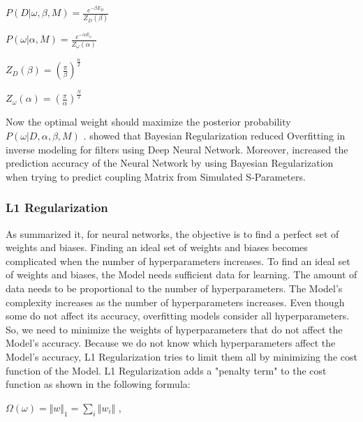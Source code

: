 \documentclass[oneside,12pt,article]{article}
\begin{document}
 \begin{center}
$ P(D|\omega,\beta,M) = \frac{e^{-\beta E_D} }{Z_D(\beta) } $
\end{center}

 \begin{center}
$ P(\omega|\alpha,M) =\frac{e^{-\alpha E_\omega}}{Z_\omega(\alpha)} $
\end{center}

 \begin{center}
$ Z_D(\beta) =(\frac{\pi}{\beta})^\frac{n}{2}$
\end{center}

 \begin{center}
$ Z_\omega(\alpha)=(\frac{\pi}{\alpha})^\frac{N}{2} $
\end{center}
Now the optimal weight should maximize the posterior probability $ P(\omega| D,\alpha, \beta,M) $ \cite{yue2011bayesian}. \cite{pan2020inverse} showed that Bayesian Regularization reduced Overfitting in inverse modeling for filters using Deep Neural Network. Moreover, \cite{pan2020inverse} increased the prediction accuracy of the Neural Network by using Bayesian Regularization when trying to predict coupling Matrix from Simulated S-Parameters.  


\subsubsection{L1 Regularization}

As \cite{ ying2019overview} summarized it, for neural networks, the objective is to find a perfect set of weights and biases. Finding an ideal set of weights and biases becomes complicated when the number of hyperparameters increases. To find an ideal set of weights and biases, the Model needs sufficient data for learning. The amount of data needs to be proportional to the number of hyperparameters. The Model's complexity increases as the number of hyperparameters increases. Even though some do not affect its accuracy, overfitting models consider all hyperparameters. So, we need to minimize the weights of hyperparameters that do not affect the Model's accuracy. Because we do not know which hyperparameters affect the Model's accuracy, L1 Regularization tries to limit them all by minimizing the cost function of the Model. L1 Regularization adds a "penalty term" to the cost function as shown in the following formula:

 \begin{center}
 $\Omega (\omega) = \Vert w \Vert_1 = \sum_{i} \Vert w_i \Vert$ ,
\end{center}
\end{document}
